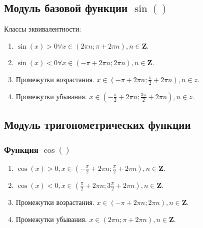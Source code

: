 \documentclass[a4paper,10pt]{article}
\begin{document}
    \subsection*{Модуль базовой функции $\sin()$}
 Классы эквивалентности:
 \begin{enumerate}
 	\item $\sin(x) > 0 \forall x \in (2\pi n; \pi+2\pi n), n \in \mathbf Z$.
 	\item $\sin(x) < 0 \forall x \in (-\pi+2\pi n; 2\pi n), n \in \mathbf Z$.
 	\item Промежутки возрастания. $x \in (-\pi +2\pi n;\frac {\pi} {2}+2\pi n),    n \in z$.
 	\item Промежутки убывания. $x \in (- \frac {\pi} {2}+2\pi n;\frac {3\pi} {2}+2\pi n), n \in z$.
  \end{enumerate}
    \subsection*{Модуль тригонометрических функции} 
		\subsubsection*{Функция $\cos()$}

	\begin{enumerate}
		\item  $\cos(x)>0, x \in (-\frac {\pi} {2}+2\pi n; \frac {\pi} {2}+2\pi n), n \in \mathbf Z$.
		\item  $\cos(x)<0, x \in (\frac {\pi} {2}+2\pi n;3\frac {\pi} {2}+2\pi n), n \in \mathbf Z$.
		\item  Промежутки возрастания. $x \in (-\pi+2\pi n;2\pi n), n \in \mathbf Z$.
		\item  Промежутки убывания. $x \in (2\pi n;\pi+2\pi n), n \in \mathbf Z$.
	\end{enumerate}
\end{document}
